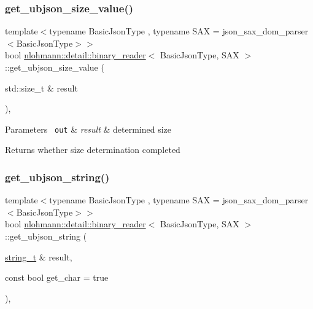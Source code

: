 \subsubsection{\texorpdfstring{get\_ubjson\_size\_value()}{get\_ubjson\_size\_value()}}
{\footnotesize\ttfamily template$<$typename Basic\+Json\+Type , typename S\+AX  = json\+\_\+sax\+\_\+dom\+\_\+parser$<$\+Basic\+Json\+Type$>$$>$ \\
bool \mbox{\hyperlink{classnlohmann_1_1detail_1_1binary__reader}{nlohmann\+::detail\+::binary\+\_\+reader}}$<$ Basic\+Json\+Type, S\+AX $>$\+::get\+\_\+ubjson\+\_\+size\+\_\+value (\begin{DoxyParamCaption}\item[{std\+::size\+\_\+t \&}]{result }\end{DoxyParamCaption})\hspace{0.3cm}{\ttfamily [inline]}, {\ttfamily [private]}}


\begin{DoxyParams}[1]{Parameters}
\mbox{\texttt{ out}}  & {\em result} & determined size \\
\hline
\end{DoxyParams}
\begin{DoxyReturn}{Returns}
whether size determination completed 
\end{DoxyReturn}
\mbox{\label{classnlohmann_1_1detail_1_1binary__reader_a2e01eab458020d18c975e8df55b20eca}} 
\subsubsection{\texorpdfstring{get\_ubjson\_string()}{get\_ubjson\_string()}}
{\footnotesize\ttfamily template$<$typename Basic\+Json\+Type , typename S\+AX  = json\+\_\+sax\+\_\+dom\+\_\+parser$<$\+Basic\+Json\+Type$>$$>$ \\
bool \mbox{\hyperlink{classnlohmann_1_1detail_1_1binary__reader}{nlohmann\+::detail\+::binary\+\_\+reader}}$<$ Basic\+Json\+Type, S\+AX $>$\+::get\+\_\+ubjson\+\_\+string (\begin{DoxyParamCaption}\item[{\mbox{\hyperlink{classnlohmann_1_1detail_1_1binary__reader_aa0b9729917ca7ee6ed01e3792341316e}{string\+\_\+t}} \&}]{result,  }\item[{const bool}]{get\+\_\+char = {\ttfamily true} }\end{DoxyParamCaption})\hspace{0.3cm}{\ttfamily [inline]}, {\ttfamily [private]}}



